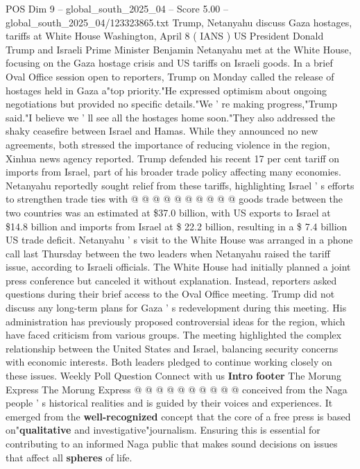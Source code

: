 \begin{textsample}{POS Dim 9 – global\_south\_2025\_04 – Score 5.00 – global\_south\_2025\_04/123323865.txt}  \label{ex:f9_pos_182}
Trump, Netanyahu discuss Gaza hostages, tariffs at White House Washington, April 8 ( IANS ) US President Donald Trump and Israeli Prime Minister Benjamin Netanyahu met at the White House, focusing on the Gaza hostage crisis and US tariffs on Israeli goods.
In a brief Oval Office session open to reporters, Trump on Monday called the release of hostages held in Gaza a"top priority."He expressed optimism about ongoing negotiations but provided no specific details."We ' re making progress,"Trump said."I believe we ' ll see all the hostages home soon."They also addressed the shaky ceasefire between Israel and Hamas.
While they announced no new agreements, both stressed the importance of reducing violence in the region, Xinhua news agency reported.
Trump defended his recent 17 per cent tariff on imports from Israel, part of his broader trade policy affecting many economies.
Netanyahu reportedly sought relief from these tariffs, highlighting Israel ' s efforts to strengthen trade ties with @ @ @ @ @ @ @ @ @ @ goods trade between the two countries was an estimated at \$37.0 billion, with US exports to Israel at \$14.8 billion and imports from Israel at \$ 22.2 billion, resulting in a \$ 7.4 billion US trade deficit.
Netanyahu ' s visit to the White House was arranged in a phone call last Thursday between the two leaders when Netanyahu raised the tariff issue, according to Israeli officials.
The White House had initially planned a joint press conference but canceled it without explanation.
Instead, reporters asked questions during their brief access to the Oval Office meeting.
Trump did not discuss any long-term plans for Gaza ' s redevelopment during this meeting.
His administration has previously proposed controversial ideas for the region, which have faced criticism from various groups.
The meeting highlighted the complex relationship between the United States and Israel, balancing security concerns with economic interests.
Both leaders pledged to continue working closely on these issues.
Weekly Poll Question Connect with us \textbf{Intro} \textbf{footer} The Morung Express The Morung Express @ @ @ @ @ @ @ @ @ @ conceived from the Naga people ' s historical realities and is guided by their voices and experiences.
It emerged from the \textbf{well-recognized} concept that the core of a free press is based on"\textbf{qualitative} and investigative"journalism.
Ensuring this is essential for contributing to an informed Naga public that makes sound decisions on issues that affect all \textbf{spheres} of life.

\end{textsample}
